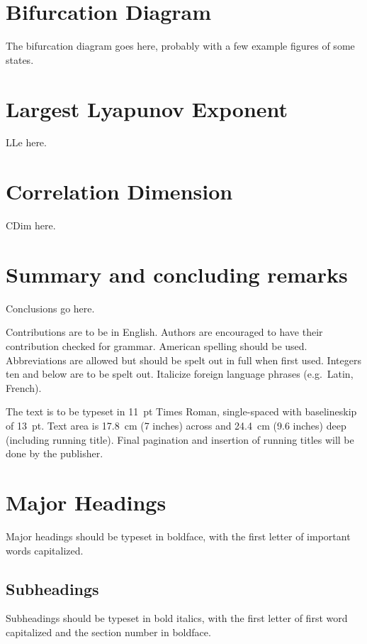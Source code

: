 \documentclass{ws-ijbc}
\begin{document}
\section{Bifurcation Diagram}
\label{sec.bi}

The bifurcation diagram goes here, probably with a few example figures of some states. 


\section{Largest Lyapunov Exponent}
\label{sec.lle}

LLe here. 


\section{Correlation Dimension}
\label{sec.dim}

CDim here. 


\section{Summary and concluding remarks}
\label{sec.conc}

Conclusions go here. 




\noindent Contributions are to be in English. Authors are
encouraged to have their contribution checked for grammar.
American spelling should be used. Abbreviations are allowed but
should be spelt out in full when first used. Integers ten and
below are to be spelt out. Italicize foreign language phrases
(e.g.~Latin, French).

The text is to be typeset in 11~pt Times \hbox{Roman},
single-spaced with baselineskip of 13~pt. Text area is 17.8~cm (7
inches) across and 24.4~cm (9.6 inches) deep (including running
title). Final pagination and insertion of running titles will be
done by the publisher.

\section{Major Headings}
Major headings should be typeset in boldface, with the first
letter of important words capitalized.

\subsection{Subheadings}
Subheadings should be typeset in bold italics, with the first
letter of first word capitalized and the section number in
boldface.
\end{document}
